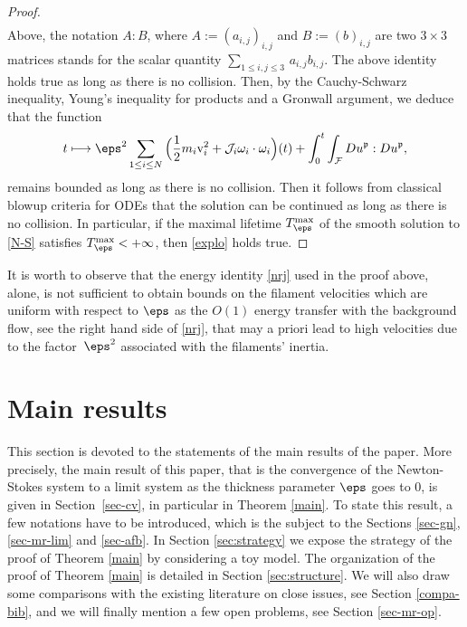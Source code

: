 \begin{proof}
\begin{multline}
\end{multline}
Above, the notation $A:B$, where $A:= (a_{i,j})_{i,j}$ and $B:=(b)_{i,j}$ are two $3\times 3$ matrices stands for the scalar quantity $\sum_{1\leqslant i,j \leqslant 3} \, a_{i,j} b_{i,j}$.
The above identity holds true
as long as there is no collision.
Then, by the Cauchy-Schwarz inequality, Young's inequality for products and a Gronwall argument, we deduce that the function
\[
t \longmapsto \eps^2 \sum_{1\leq i \leq N} \Big(\frac12 m_i \textrm{v}_i^2
+ \mathcal{J}_i \omega_i \cdot \omega_i \Big) (t) + \int_0^t \int_{\mathcal F} D u^\mathfrak{p} : D u^\mathfrak{p},
\]
remains bounded as long as there is no collision.
Then it follows from classical blowup criteria for ODEs that the solution can be continued as long as there is no collision. In particular, if the maximal lifetime $ T^{\max}_\eps $ of the smooth solution to \eqref{N-S} satisfies $ T^{\max}_\eps < +\infty$, then
\eqref{explo} holds true.
\end{proof}
\begin{remark}
\label{rk-nrj}
It is worth to observe that the energy identity \eqref{nrj} used in the proof above, alone, is not sufficient to obtain bounds on the filament velocities which are uniform with respect to $\eps$ as the $O(1)$ energy transfer with the background flow, see the right hand side of \eqref{nrj}, that may a priori lead to high velocities due to the factor~$\eps^2$ associated with the filaments' inertia.
\end{remark}

\section{Main results}
\label{sec-mr}

This section is devoted to the statements of the main results of the paper.
More precisely, the main result of this paper, that is
the convergence of the Newton-Stokes system to a limit system as the thickness parameter $\eps$ goes to $0$, is given in Section~\ref{sec-cv}, in particular in Theorem \ref{main}.
To state this result, a few notations have to be introduced, which is the subject to the Sections \ref{sec-gn}, \ref{sec-mr-lim} and \ref{sec-afb}.
In Section \ref{sec:strategy} we expose the strategy of the proof of Theorem \ref{main} by considering a toy model.
The organization of the proof of Theorem \ref{main} is detailed in Section
\ref{sec:structure}.
We will also draw some comparisons with the existing literature on close issues, see Section \ref{compa-bib}, and we will finally mention a few open problems, see Section \ref{sec-mr-op}.

